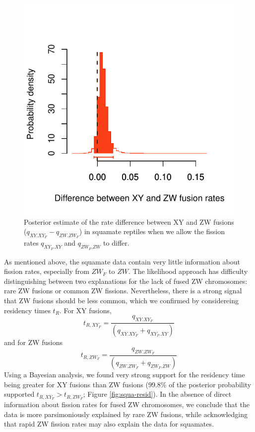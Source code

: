 \documentclass[12pt,twoside]{article}
\begin{document}
\begin{figure}[p]
\centering
\includegraphics[scale=1.25]{figs/karyotype-fusion-squa-6par}
\caption{Posterior estimate of the rate difference between XY and ZW fusions ($q_{XY.XY_F} - q_{ZW.ZW_F}$) in squamate reptiles when we allow the fission rates $q_{XY_F.XY}$ and $q_{ZW_F.ZW}$ to differ.}
\label{fig:squa-dif}
\end{figure}

As mentioned above, the squamate data contain very little information about fission rates, especially from $ZW_F$ to $ZW$. The likelihood approach has difficulty distinguishing between two explanations for the lack of fused ZW chromosomes: rare ZW fusions or common ZW fissions. Nevertheless, there is a strong signal that ZW fusions should be less common, which we confirmed by considereing residency times $t_R$. For XY fusions,
\begin{equation}
t_{R,XY_F} = \frac{q_{XY.XY_F}}{(q_{XY.XY_F} + q_{XY_F.XY})}
\end{equation}
and for ZW fusions
\begin{equation}
t_{R,ZW_F} = \frac{q_{ZW.ZW_F}}{(q_{ZW.ZW_F} + q_{ZW_F.ZW})}
\end{equation}
Using a Bayesian analysis, we found very strong support for the residency time being greater for XY fusions than ZW fusions (99.8\% of the posterior probability supported $t_{R,XY_F} > t_{R,ZW_F}$; Figure \ref{fig:squa-resid}). In the absence of direct information about fission rates for fused ZW chromosomes, we conclude that the data is more parsimoniously explained by rare ZW fusions, while acknowledging that rapid ZW fission rates may also explain the data for squamates.
\end{document}
